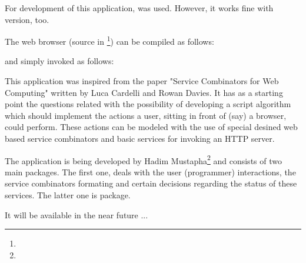 \documentclass{ozdoc}
\begin{document}
For development of this application,  was used. However, it works fine with  version, too. \mozartEMPTY


The web browser (source in \footnote{}) can be compiled as follows: \mozartEMPTY
\begin{mozartCODEDISPLAY}\mozartFACEKEYWORD{-}\end{mozartCODEDISPLAY}


and simply invoked as follows: \mozartEMPTY
\begin{mozartCODEDISPLAY}\end{mozartCODEDISPLAY}





This application was inspired from the paper "Service Combinators for Web Computing" written by Luca Cardelli and Rowan Davies. It has as a starting point the questions related with the possibility of developing a script algorithm which should implement the actions a user, sitting in front of (say) a browser, could perform. These actions can be modeled with the use of special desined web based service combinators and basic services for invoking an HTTP server.

The application is being developed by Hadim Mustapha\footnote{} and consists of two main packages. The first one, deals with the user (programmer) interactions, the service combinators formating and certain decisions regarding the status of these services. The latter one is  package.  \mozartEMPTY


It will be available in the near future ... \mozartEMPTY
 \mozartEMPTY
  
\end{document}
